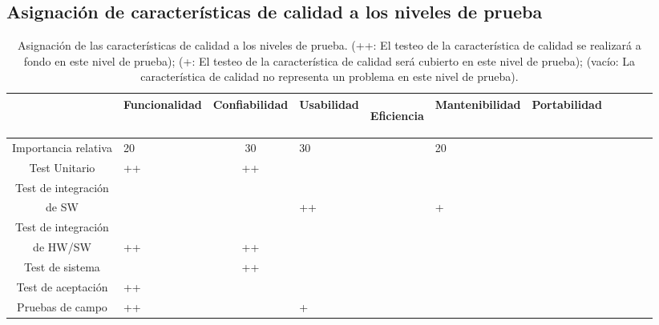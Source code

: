 \documentclass[11pt]{article}
\begin{document}
\subsection{Asignación de características de calidad a los niveles de prueba}
\FloatBarrier
\begin{table}[!ht]
    \centering

    \begin{tabularx}{\linewidth}{@{}|c|X|c|X|c|X|c|X|c|X|c|@{}}\hline \hline
        \rowcolor[HTML]{d6c6c3}
            \small                        &   \footnotesize \bf Funcionalidad  & \footnotesize \bf Confiabilidad & \footnotesize  \bf Usabilidad &
       \footnotesize \bf
      
        Eficiencia                      & \footnotesize\bf Mantenibilidad &\footnotesize \bf
        Portabilidad                                                                                \\ \hline
        \hline
        Importancia relativa            & 20                 &
        30                              & 30                 &                   & 20             &
        \\
        Test Unitario                   & ++                 & ++
                                        &                    &                   &                & \\
        Test de integración &&&&&&\\ de SW &                    &
                                        & ++                 &                   & +              &
        \\
        Test de integración &&&&&&\\ de HW/SW       & ++                 & ++
                                        &                    &                   &                &
        \\
        Test de sistema                 &                    & ++
                                        &                    &                   &                & \\
        Test de aceptación              & ++                 &
                                        &                    &                   &
                                        &
        \\
        Pruebas de campo                & ++                 &
                                        & +                  &                   &                &
        \\ \hline
    \end{tabularx}
    \caption{Asignación de las características de calidad a los niveles de
        prueba. (++: El testeo de la característica de calidad
        se realizará a fondo en este nivel de prueba); (+: El testeo de la
        característica de calidad será cubierto en este nivel de
        prueba); (vacío: La característica de calidad no representa un problema en este
        nivel de prueba).}

\end{table}
\end{document}
